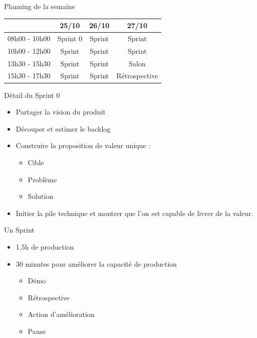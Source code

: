 \documentclass{beamer}
\begin{document}
\begin{frame}{Planning de la semaine}{}
  {
    \center
    \begin{tabular}{l | c | c | c | }
                    & \textbf{25/10} & \textbf{26/10} & \textbf{27/10} \\
      \hline
      08h00 - 10h00 & Sprint 0       & Sprint         & Sprint         \\
      \hline
      10h00 - 12h00 & Sprint         & Sprint         & Sprint         \\
      \hline
      \hline
      13h30 - 15h30 & Sprint         & Sprint         & Salon     \\
      \hline
      15h30 - 17h30 & Sprint         & Sprint         & Rétrospective  \\
      \hline
    \end{tabular}
  }

\end{frame}

\begin{frame}{Détail du Sprint 0}
  \begin{itemize}
    \item Partager la vision du produit
    \item Découper et estimer le backlog
    \item Construire la proposition de valeur unique :
    \begin{itemize}
      \item Cible
      \item Problème
      \item Solution
    \end{itemize}
    \item Initier la pile technique et montrer que l'on est capable de livrer de la valeur.
  \end{itemize}
\end{frame}

\begin{frame}{Un Sprint}
  \begin{itemize}
    \item 1,5h de production
    \item 30 minutes pour améliorer la capacité de production
    \begin{itemize}
      \item Démo
      \item Rétrospective
      \item Action d'amélioration
      \item Pause
    \end{itemize}
  \end{itemize}
\end{frame}
\end{document}
